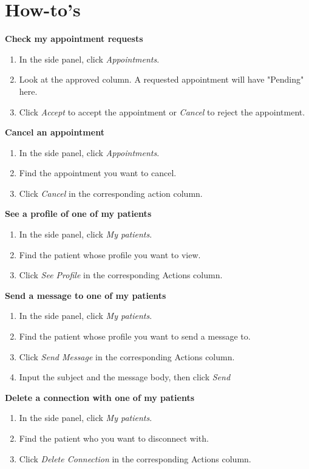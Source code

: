 \documentclass[10pt]{report}
\begin{document}
\section{How-to's}

\textbf{Check my appointment requests}
\begin{enumerate}
\item In the side panel, click \textit{ Appointments}.
\item Look at the approved column. A requested appointment will have "Pending" here.
\item Click \textit{Accept} to accept the appointment or \textit{Cancel} to reject the appointment.
\end{enumerate}
\textbf{Cancel an appointment}
\begin{enumerate}
\item In the side panel, click \textit{Appointments}.
\item Find the appointment you want to cancel. 
\item Click \textit{Cancel} in the corresponding action column.
\end{enumerate}
\textbf{See a profile of one of my patients}
\begin{enumerate}
\item In the side panel, click \textit{My patients}.
\item Find the patient whose profile you want to view.
\item Click \textit{See Profile} in the corresponding Actions column.
\end{enumerate}
\textbf{Send a message to one of my patients}
\begin{enumerate}
\item In the side panel, click \textit{My patients}.
\item Find the patient whose profile you want to send a message to.
\item Click \textit{Send Message} in the corresponding Actions column.
\item Input the subject and the message body, then click \textit{Send}
\end{enumerate}
\textbf{Delete a connection with one of my patients}
\begin{enumerate}
\item In the side panel, click \textit{My patients}.
\item Find the patient who you want to disconnect with.
\item Click \textit{Delete Connection} in the corresponding Actions column.
\end{enumerate}
\end{document}

